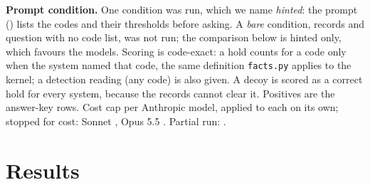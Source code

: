 \documentclass[conference]{IEEEtran}
\newcommand{\code}[1]{\texttt{#1}}
\begin{document}
\textbf{Prompt condition.} One condition was run, which we name \emph{hinted}: the prompt (\basePrompt) lists the \nClasses{} codes and their thresholds before asking. A \emph{bare} condition, records and question with no code list, was not run; the comparison below is hinted only, which favours the models. Scoring is code-exact: a hold counts for a code only when the system named that code, the same definition \code{facts.py} applies to the kernel; a detection reading (any code) is also given. A decoy is scored as a correct hold for every system, because the records cannot clear it. Positives are the \nKeyRows{} answer-key rows. Cost cap \sonnetCapUsd{} per Anthropic model, applied to each on its own; stopped for cost: Sonnet \sonnetStopped, Opus 5.5 \opusStopped. Partial run: \basePartial.

\section{Results}

\begin{table}[t]
\centering
\caption{Precision / recall per code, code-exact; key rows include the decoys. Caliber on the full \caliberRowsEvaluated-row run; the three models on the \baseRows-row sample. Generated \baseGeneratedAt.}
\label{tab:baseline}
\scriptsize
\setlength{\tabcolsep}{2pt}
\end{table}
\end{document}
